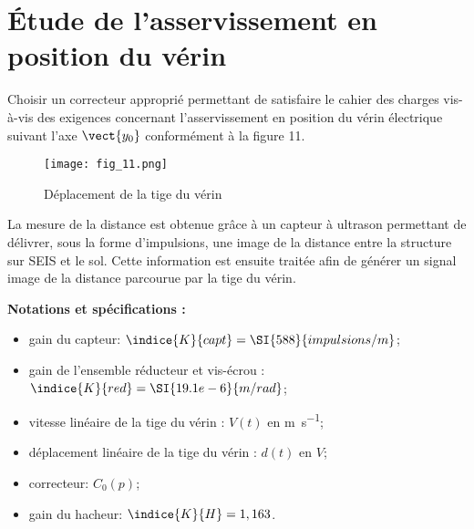 
\section{Étude de l’asservissement en position du vérin}

\begin{obj}
Choisir un correcteur approprié permettant de satisfaire le cahier des charges vis-à-vis des 
exigences concernant l’asservissement en position du vérin électrique suivant l’axe $\vect{y_0}$
conformément à la figure 11.
\end{obj}

\begin{figure}[!h]
\centering
\texttt{[image: fig\_11.png]}
\caption{Déplacement de la tige du vérin\label{fig_11}}
\end{figure}

La mesure de la distance est obtenue grâce à un capteur à ultrason permettant de délivrer, sous la 
forme d’impulsions, une image de la distance entre la structure sur SEIS et le sol. Cette information 
est ensuite traitée afin de générer un signal image de la distance parcourue par la tige du vérin.

%

\textbf{Notations et spécifications :}
\begin{multicols}{2}
\begin{itemize}
\item gain du capteur: $\indice{K}{capt} = \SI{588}{impulsions/m}$;
\item gain de l’ensemble réducteur et vis-écrou : $\indice{K}{red} = \SI{19.1e-6}{m/rad}$;
\item vitesse linéaire de la tige du vérin : $V(t)$ en \si{m.s^{-1}};
\item déplacement linéaire de la tige du vérin : $d(t)$ en $\si{V}$;
\item correcteur: $C_0(p)$;
\item gain du hacheur: $\indice{K}{H} = 1,163$.
\end{itemize}
\end{multicols}

